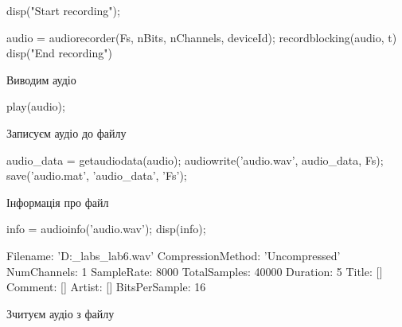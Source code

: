 \documentclass[12pt]{article}
\begin{document}
\begin{matlabcode}
disp("Start recording");
\end{matlabcode}
\begin{matlabcode}
audio = audiorecorder(Fs, nBits, nChannels, deviceId);
recordblocking(audio, t)
disp("End recording")
\end{matlabcode}

\begin{par}
\begin{flushleft}
Виводим аудіо
\end{flushleft}
\end{par}

\begin{matlabcode}
play(audio);
\end{matlabcode}

\begin{par}
\begin{flushleft}
Записуєм аудіо до файлу
\end{flushleft}
\end{par}

\begin{matlabcode}
audio_data = getaudiodata(audio);
audiowrite('audio.wav', audio_data, Fs);
save('audio.mat', 'audio_data', 'Fs');
\end{matlabcode}





\begin{par}
\begin{flushleft}
Інформація про файл
\end{flushleft}
\end{par}

\begin{matlabcode}
info = audioinfo('audio.wav');
disp(info);
\end{matlabcode}
\begin{matlaboutput}
             Filename: 'D:\university\5\ma_labs\ma_lab6\audio.wav'
    CompressionMethod: 'Uncompressed'
          NumChannels: 1
           SampleRate: 8000
         TotalSamples: 40000
             Duration: 5
                Title: []
              Comment: []
               Artist: []
        BitsPerSample: 16
\end{matlaboutput}

\begin{par}
\begin{flushleft}
Зчитуєм аудіо з файлу
\end{flushleft}
\end{par}
\end{document}
